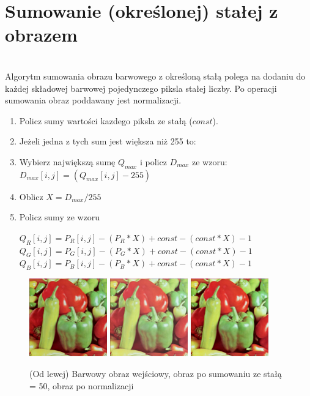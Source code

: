 \documentclass[final,a4paper,openany,12pt]{mwbk}
\begin{document}
\section{Sumowanie (określonej) stałej z obrazem}
\hfill\\
\indent
Algorytm sumowania obrazu barwowego z określoną stałą polega na dodaniu do każdej składowej barwowej pojedynczego piksla stałej liczby.
Po operacji sumowania obraz poddawany jest normalizacji.

	\begin{enumerate}	
		\item Policz sumy wartości kazdego piksla ze stałą ($const$).
		\item Jeżeli jedna z tych sum jest większa niż 255 to:
		\item Wybierz największą sumę  $Q_{max}$ i policz $D_{max}$ ze wzoru: $D_{max}[i,j] = (Q_{max}[i,j] - 255)$ 
		\item Oblicz $X = D_{max} / 255$
		\item Policz sumy ze wzoru
		\begin{center}$Q_{R}[i,j] = P_{R}[i,j] - (P_{R} * X)+ const - (const * X) -1$ \\
			$Q_{G}[i,j] = P_{G}[i,j] - (P_{G} * X)+ const - (const * X) -1$ \\
			$Q_{B}[i,j] = P_{B}[i,j] - (P_{B} * X)+ const - (const * X) -1$
		\end{center}
	\end{enumerate}

\begin{figure}[H]
	\begin{center}
		\includegraphics[width=0.3\textwidth]{1/1Color_Const_Sum_Original}
		\includegraphics[width=0.3\textwidth]{1/1Color_Const_Sum_Result}
		\includegraphics[width=0.3\textwidth]{1/1Color_Const_Sum_Result_Norm}
	\end{center}
	\caption{(Od lewej) Barwowy obraz wejściowy, obraz po sumowaniu ze stałą = 50, obraz po normalizacji }
\end{figure}
\end{document}
